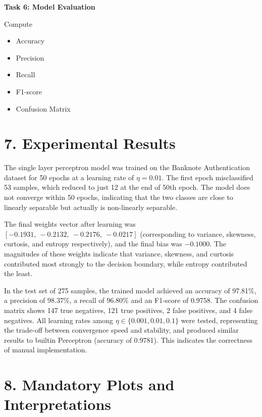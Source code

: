 \documentclass[11pt]{article}
\begin{document}
\vspace{2mm}

\textbf{Task 6: Model Evaluation}

Compute
\begin{itemize}
\item Accuracy
\item Precision
\item Recall
\item F1-score
\item Confusion Matrix
\end{itemize}


\section*{7. Experimental Results}

The single layer perceptron model was trained on the Banknote Authentication dataset for 50 epochs at a learning rate of $\eta = 0.01$. The first epoch misclassified 53 samples, which reduced to just 12 at the end of 50th epoch. The model does not converge within 50 epochs, indicating that the two classes are close to linearly separable but actually is non-linearly separable.

The final weights vector after learning was $[-0.1931,\ -0.2132,\ -0.2176,\ -0.0217]$ (corresponding to variance, skewness, curtosis, and entropy respectively), and the final bias was $-0.1000$. The magnitudes of these weights indicate that variance, skewness, and curtosis contributed most strongly to the decision boundary, while entropy contributed the least.

In the test set of 275 samples, the trained model achieved an accuracy of 97.81\%, a precision of 98.37\%, a recall of 96.80\% and an F1-score of 0.9758. The confusion matrix shows 147 true negatives, 121 true positives, 2 false positives, and 4 false negatives. All learning rates among  $\eta \in \{0.001, 0.01, 0.1\}$  were tested, representing the trade-off between convergence speed and stability, and produced similar results to builtin Perceptron (accuracy of 0.9781). This indicates the correctness of manual implementation.


\section*{8. Mandatory Plots and Interpretations}
\end{document}
